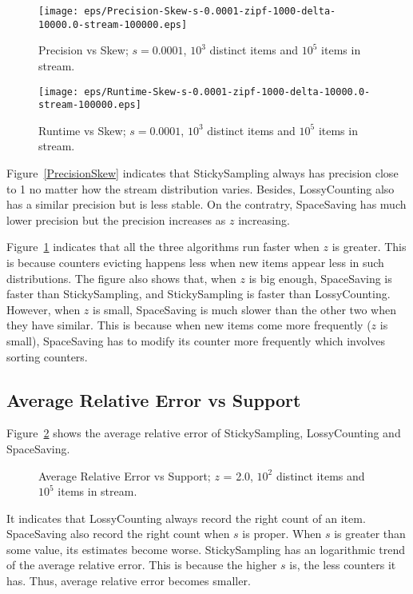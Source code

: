 \documentclass[10pt]{article}
\begin{document}
\begin{figure}[H]
      \begin{minipage}{0.48\textwidth}
        \centering
        \texttt{[image: eps/Precision-Skew-s-0.0001-zipf-1000-delta-10000.0-stream-100000.eps]}
        \caption{Precision vs Skew; $s=0.0001$, $10^3$ distinct items and $10^5$ items in stream.}
        \label{PrecisionSkew}
      \end{minipage}\hfill
      \begin{minipage}{0.48\textwidth}
        \centering
        \texttt{[image: eps/Runtime-Skew-s-0.0001-zipf-1000-delta-10000.0-stream-100000.eps]}
        \caption{Runtime vs Skew; $s=0.0001$, $10^3$ distinct items and $10^5$ items in stream.}
        \label{RuntimeSkew}
      \end{minipage}
\end{figure}

Figure~\ref{PrecisionSkew} indicates that 
StickySampling always has precision close to 1 no matter how the 
stream distribution varies. 
Besides, LossyCounting also has a similar precision but is less stable.
On the contratry, SpaceSaving has much lower precision but the precision
increases as $z$ increasing.

Figure~\ref{RuntimeSkew} indicates that all the three algorithms run faster
when $z$ is greater. This is because counters evicting happens less
when new items appear less in such distributions. 
The figure also shows that, when $z$ is big enough, SpaceSaving is faster than StickySampling, 
and StickySampling is faster than LossyCounting. 
However, when $z$ is small, SpaceSaving is much slower than the other two when they have
similar. 
This is because when new items come more frequently ($z$ is small),
SpaceSaving has to modify its counter more frequently which involves sorting counters.

\subsection{Average Relative Error vs Support}
Figure~\ref{AverageRelativeErrorSupport} shows the average relative error of StickySampling, LossyCounting and SpaceSaving.

 \begin{figure}[H]
      \centering
     \begin{subfigure}[b]{0.6\textwidth}
      \centering
      \end{subfigure}
      \caption{Average Relative Error vs Support; $z$ = 2.0, $10^2$ distinct items and $10^5$ items in stream.}  
      \label{AverageRelativeErrorSupport}
 \end{figure}
It indicates that 
 LossyCounting always record the right count of an item.
 SpaceSaving also record the right count when $s$ is proper. 
 When $s$ is greater than some value, its estimates become worse.
 StickySampling has an logarithmic trend of the average relative error.
 This is because the higher $s$ is, the less counters it has. 
 Thus, average relative error becomes smaller.
\end{document}
